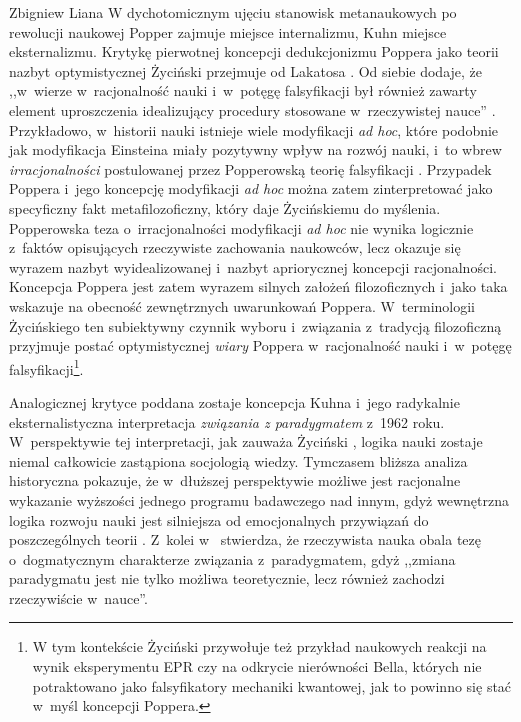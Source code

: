 \begin{artplenv}{Zbigniew Liana}
W dychotomicznym ujęciu stanowisk metanaukowych po rewolucji naukowej Popper zajmuje miejsce internalizmu, Kuhn miejsce
eksternalizmu. Krytykę pierwotnej koncepcji dedukcjonizmu Poppera jako teorii nazbyt optymistycznej Życiński przejmuje
od Lakatosa
\parencite[zob.][s.~120n]{zycinski_jezyk_1983}.
Od siebie dodaje, że  ,,w~wierze w~racjonalność
nauki i~w~potęgę falsyfikacji był również zawarty element uproszczenia idealizujący procedury stosowane w~rzeczywistej
nauce'' 
\parencite[s.~230]{zycinski_elementy_1996}.
Przykładowo, w~historii nauki istnieje wiele modyfikacji
\textit{ad hoc}, które podobnie jak modyfikacja Einsteina miały pozytywny wpływ na rozwój nauki, i~to wbrew
\textit{irracjonalności} postulowanej przez Popperowską teorię falsyfikacji
\parencite[zob.][s.~108]{zycinski_elementy_1996}.
Przypadek Poppera i~jego koncepcję modyfikacji \textit{ad hoc} można zatem zinterpretować jako specyficzny
fakt metafilozoficzny, który daje Życińskiemu do myślenia. Popperowska teza o~irracjonalności modyfikacji \textit{ad hoc}
nie wynika logicznie z~faktów opisujących rzeczywiste zachowania naukowców, lecz okazuje się wyrazem nazbyt
wyidealizowanej i~nazbyt apriorycznej koncepcji racjonalności. Koncepcja Poppera jest zatem wyrazem silnych założeń
filozoficznych i~jako taka wskazuje na obecność zewnętrznych uwarunkowań Poppera. W~terminologii Życińskiego ten
subiektywny czynnik wyboru i~związania z~tradycją filozoficzną przyjmuje postać optymistycznej \textit{wiary}
Poppera w~racjonalność nauki i~w~potęgę falsyfikacji\footnote{W tym kontekście Życiński przywołuje też przykład naukowych reakcji
na wynik eksperymentu EPR czy na  odkrycie nierówności Bella, których nie potraktowano jako
falsyfikatory mechaniki kwantowej, jak to
powinno się stać w~myśl koncepcji Poppera.}.

Analogicznej krytyce poddana zostaje koncepcja Kuhna i~jego radykalnie eksternalistyczna interpretacja
\textit{związania z	paradygmatem} z~1962 roku. W~perspektywie tej interpretacji, jak zauważa Życiński 
\parencite*[s.~106]{zycinski_jezyk_1983},
logika nauki zostaje niemal całkowicie zastąpiona socjologią wiedzy. Tymczasem bliższa analiza
historyczna pokazuje, że w~dłuższej perspektywie możliwe jest racjonalne wykazanie wyższości jednego programu
badawczego nad innym, gdyż wewnętrzna logika rozwoju nauki jest silniejsza od emocjonalnych przywiązań do
poszczególnych teorii
\parencite*[s.~165]{zycinski_jezyk_1983}.
Z~kolei w~\parencite*[s.~195]{zycinski_elementy_1996}
stwierdza, że
rzeczywista nauka obala tezę o~dogmatycznym charakterze związania z~paradygmatem, gdyż ,,zmiana paradygmatu jest nie
tylko możliwa teoretycznie, lecz również zachodzi rzeczywiście w~nauce''.


\end{artplenv}
